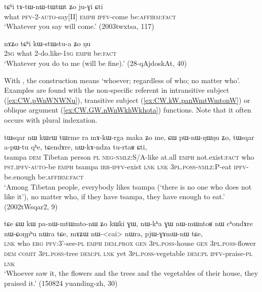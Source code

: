 \begin{exe}
\ex \label{ex:tChi.tAtWnWtWtWt}
\gll tɕʰi tɤ-tɯ-nɯ-tɯ\redp{}tɯt ʑo ju-ɣi ɕti \\
what \textsc{pfv}-2-\textsc{auto}-say[II] \textsc{emph} \textsc{ipfv}-come be:\textsc{affirm:fact} \\
\glt  `Whatever you say will come.' (2003twxtsa, 117)
\end{exe}  

\begin{exe}
\ex \label{ex:tChi.kWstWstua}
\gll nɤʑo tɕʰi kɯ-stɯ\redp{}stu-a ʑo ŋu \\
\textsc{2sg} what 2-do.like-\textsc{1sg} \textsc{emph} be:\textsc{fact} \\
\glt `Whatever you do to me (will be fine).' (28-qAjdoskAt, 40)
\end{exe}


With , the construction means `whoever; regardless of who; no matter who'. Examples are found with the non-specific referent in intransitive subject (\ref{ex:CW.pWnWNWNu}), transitive subject (\ref{ex:CW.kW.panWmtWmtonW}) or oblique argument (\ref{ex:CW.GW.nWnWkhWkhota}) functions. Note that it often occurs with plural indexation.

\begin{exe}
\ex \label{ex:CW.pWnWNWNu}
\gll tɯsqar nɯ kɯrɯ tɯrme ra mɤ-kɯ-rga maka ʑo me, ɕɯ pɯ-nɯ-ŋɯ\redp{}ŋu ʑo, tɯsqar a-pɯ-tu qʰe, tɕendɤre, nɯ-kɤ-ndza tu-rtaʁ ɕti, \\
tsampa \textsc{dem} Tibetan person \textsc{pl} \textsc{neg}-\textsc{nmlz}:S/A-like at.all \textsc{emph} not.exist:\textsc{fact} who  \textsc{pst.ipfv-auto}-be \textsc{emph} tsampa \textsc{irr}-\textsc{ipfv}-exist \textsc{lnk} \textsc{lnk} \textsc{3pl.poss}-\textsc{nmlz}:P-eat \textsc{ipfv}-be.enough be:\textsc{affirm}:\textsc{fact} \\
\glt `Among Tibetan people, everybody likes tsampa (`there is no one who does not like it'), no matter who, if they have tsampa, they have enough to eat.' (2002tWsqar2, 9)
\end{exe}

\begin{exe}
\ex \label{ex:CW.kW.panWmtWmtonW}
\gll tɕe ɕɯ kɯ pa-nɯ-mtɯ\redp{}mto-nɯ ʑo kɯki ɣɯ, nɯ-kʰa ɣɯ nɯ-mɯntoʁ nɯ cʰondɤre nɯ-ɕoŋpʰu nɯra tɕe, mɤʑɯ nɯ-<cai> nɯra, pjɯ-ɣɤmɯ-nɯ tɕe, \\
\textsc{lnk} who \textsc{erg} \textsc{pfv}:3'-see-\textsc{pl} \textsc{emph} \textsc{dem.prox} \textsc{gen} \textsc{3pl.poss}-house \textsc{gen} \textsc{3pl.poss}-flower \textsc{dem} \textsc{comit} \textsc{3pl.poss}-tree \textsc{dem:pl} \textsc{lnk} yet \textsc{3pl.poss}-vegetable \textsc{dem:pl} \textsc{ipfv}-praise-\textsc{pl} \textsc{lnk} \\
\glt `Whoever saw it, the flowers and the trees and the vegetables of their house, they praised it.' (150824 yuanding-zh, 30)
\end{exe}

